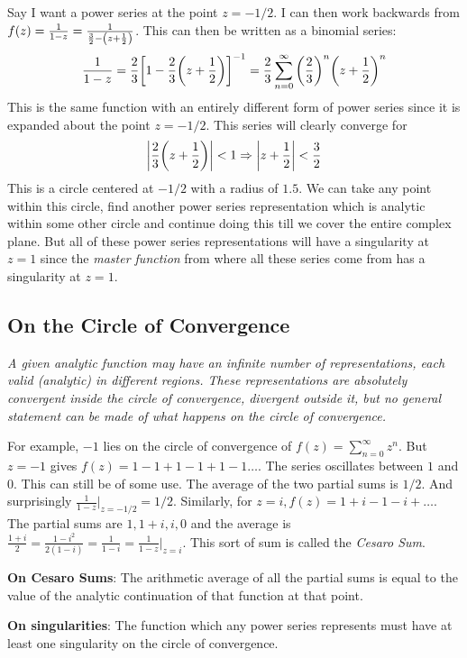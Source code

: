 \documentclass[12pt, letterpaper]{book}
\begin{document}
Say I want a power series at the point $z= -1/2$. I can then work backwards from $f(z)= \frac{1}{1-z}= \frac{1}{\frac{3}{2}- \qty(z+\frac{1}{2})}$. This can then be written as a binomial series: 
\[ \frac{1}{1-z}= \frac{2}{3}\qty[1-\frac{2}{3}\qty(z+\frac{1}{2})]^{-1}= \frac{2}{3}\sum_{n=0}^{\infty} \qty(\frac{2}{3})^n\qty(z+\frac{1}{2})^n
\]
This is the same function with an entirely different form of power series since it is expanded about the point $z=-1/2$. This series will clearly converge for $$\qty|\frac{2}{3}\qty(z+\frac{1}{2})|<1\Rightarrow \qty|z+\frac{1}{2}|<\frac{3}{2}$$
This is a circle centered at $-1/2$ with a radius of $1.5$. We can take any point within this circle, find another power series representation which is analytic within some other circle and continue doing this till we cover the entire complex plane. But all of these power series representations will have a singularity at $z=1$ since the \emph{master function} from where all these series come from has a singularity at $z=1$. 

\subsection{On the Circle of Convergence}

\emph{A given analytic function may have an infinite number of representations, each valid (analytic) in different regions. These representations are absolutely convergent inside the circle of convergence, divergent outside it, but no general statement can be made of what happens \emph{on} the circle of convergence.}

For example, $-1$ lies on the circle of convergence of $f(z)= \sum_{n=0}^{\infty} z^n$. But $z=-1$ gives $f(z)= 1-1+1-1+1-1\dots$. The series oscillates between $1$ and $0$. This can still be of some use. The average of the two partial sums is $1/2$. And surprisingly $\frac{1}{1-z}\big|_{z= -1/2}= 1/2$. Similarly, for $z=i, f(z)= 1+i-1-i+\dots$. The partial sums are $1, 1+i, i, 0$ and the average is $\frac{1+i}{2}= \frac{1-i^2}{2(1-i)}= \frac{1}{1-i}= \frac{1}{1-z}\big|_{z= i}$. This sort of sum is called the \emph{Cesaro Sum}. 

\textbf{On Cesaro Sums}: The arithmetic average of all the partial sums is equal to the value of the analytic continuation of that function at that point.

\textbf{On singularities}: The function which any power series represents must have at least one singularity on the circle of convergence. 
\end{document}
